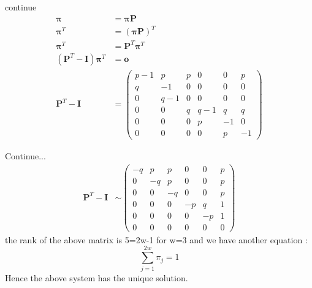 \documentclass{beamer}
\begin{document}
\begin{frame}
   \begin{block}{continue}
   \begin{align}
       \boldsymbol{\pi} &= \boldsymbol{\pi P} \nonumber \\
       \boldsymbol{\pi}^T &= (\boldsymbol{\pi P})^T \nonumber \\
       \boldsymbol{\pi}^T &= \boldsymbol{P}^T\boldsymbol{\pi}^T \nonumber \\
       (\boldsymbol{P}^T-\boldsymbol{I})\boldsymbol{\pi}^T &= \boldsymbol{o} \nonumber  \\
       \boldsymbol{P}^T-\boldsymbol{I}&=\begin{pmatrix}
                                         p-1 & p & p & 0 & 0 & p \\
                                         q  & -1 & 0 & 0 & 0 & 0 \\
                                         0 & q-1 & 0 & 0 & 0 & 0 \\
                                         0 & 0   & q & q-1 & q & q \\
                                         0 & 0 & 0 & p & -1 & 0 \\
                                         0 & 0 & 0 & 0 & p & -1 
                                         \end{pmatrix} \nonumber 
   \end{align}
    
   \end{block}
    
\end{frame}
\begin{frame}
  \begin{block}{Continue...}
  \begin{align}
      \boldsymbol{P}^T-\boldsymbol{I}& \sim \begin{pmatrix}
                                            -q & p & p & 0 & 0 & p \\
                                            0 & -q & p & 0 & 0 & p \\
                                            0 & 0 & -q & 0 & 0 & p \\
                                            0 & 0 & 0 & -p & q & 1 \\
                                            0 & 0 & 0 & 0 & -p & 1 \\
                                            0 & 0 & 0 & 0 & 0 & 0
                                            \end{pmatrix} \nonumber
  \end{align}
  the rank of the above matrix is 5=2w-1 for w=3 and we have another equation :
  \[\sum_{j=1}^{2w}\pi_j = 1\]
  Hence the above system has the unique solution.
  \end{block}
    
\end{frame}    
\end{document}
